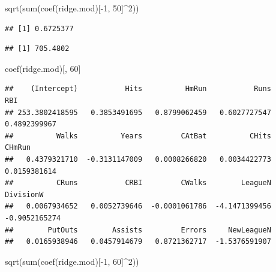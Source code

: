 \documentclass[
  12pt,
]{book}
\newenvironment{Shaded}{\begin{snugshade}}{\end{snugshade}}
\newcommand{\DecValTok}[1]{\textcolor[rgb]{0.00,0.00,0.81}{#1}}
\newcommand{\FunctionTok}[1]{\textcolor[rgb]{0.00,0.00,0.00}{#1}}
\newcommand{\NormalTok}[1]{#1}
\newcommand{\SpecialCharTok}[1]{\textcolor[rgb]{0.00,0.00,0.00}{#1}}
\begin{document}
\begin{Shaded}
\begin{Highlighting}[]
\FunctionTok{sqrt}\NormalTok{(}\FunctionTok{sum}\NormalTok{(}\FunctionTok{coef}\NormalTok{(ridge.mod)[}\SpecialCharTok{{-}}\DecValTok{1}\NormalTok{, }\DecValTok{50}\NormalTok{]}\SpecialCharTok{\^{}}\DecValTok{2}\NormalTok{))}
\end{Highlighting}
\end{Shaded}

\begin{verbatim}
## [1] 0.6725377
\end{verbatim}

\begin{Shaded}
\end{Shaded}

\begin{verbatim}
## [1] 705.4802
\end{verbatim}

\begin{Shaded}
\begin{Highlighting}[]
\FunctionTok{coef}\NormalTok{(ridge.mod)[, }\DecValTok{60}\NormalTok{]}
\end{Highlighting}
\end{Shaded}

\begin{verbatim}
##    (Intercept)           Hits          HmRun           Runs            RBI 
## 253.3802418595   0.3853491695   0.8799062459   0.6027727547   0.4892399967 
##          Walks          Years         CAtBat          CHits         CHmRun 
##   0.4379321710  -0.3131147009   0.0008266820   0.0034422773   0.0159381614 
##          CRuns           CRBI         CWalks        LeagueN      DivisionW 
##   0.0067934652   0.0052739646  -0.0001061786  -4.1471399456  -0.9052165274 
##        PutOuts        Assists         Errors     NewLeagueN 
##   0.0165938946   0.0457914679   0.8721362717  -1.5376591907
\end{verbatim}

\begin{Shaded}
\begin{Highlighting}[]
\FunctionTok{sqrt}\NormalTok{(}\FunctionTok{sum}\NormalTok{(}\FunctionTok{coef}\NormalTok{(ridge.mod)[}\SpecialCharTok{{-}}\DecValTok{1}\NormalTok{, }\DecValTok{60}\NormalTok{]}\SpecialCharTok{\^{}}\DecValTok{2}\NormalTok{))}
\end{Highlighting}
\end{Shaded}
\end{document}
